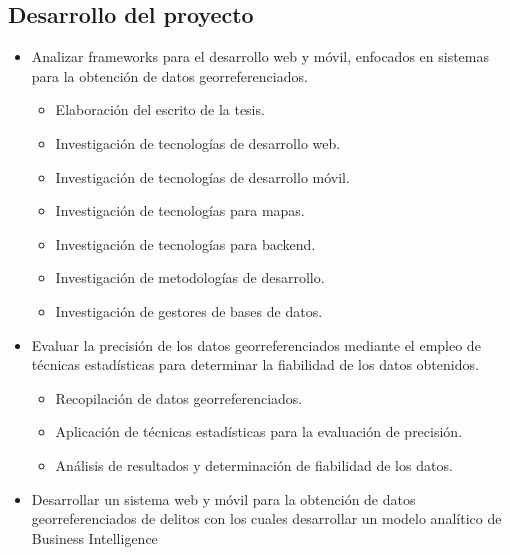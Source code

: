 \subsection{Desarrollo del proyecto}
\begin{itemize}
      \item Analizar frameworks para el
            desarrollo web y móvil, enfocados
            en sistemas para la obtención de
            datos georreferenciados.
            \begin{itemize}
                  \item Elaboración del escrito de la tesis.
                  \item Investigación de tecnologías de
                        desarrollo web.
                  \item Investigación de tecnologías de
                        desarrollo móvil.
                  \item Investigación de tecnologías
                        para mapas.
                  \item Investigación de tecnologías
                        para backend.
                  \item Investigación de metodologías
                        de desarrollo.
                  \item Investigación de gestores de
                        bases de datos.
            \end{itemize}
      \item Evaluar la precisión de los datos
            georreferenciados mediante el
            empleo de técnicas estadísticas
            para determinar la fiabilidad de los
            datos obtenidos.
            \begin{itemize}
                  \item Recopilación de datos
                        georreferenciados.
                  \item Aplicación de técnicas
                        estadísticas para la evaluación
                        de precisión.
                  \item Análisis de resultados y
                        determinación de fiabilidad
                        de los datos.
            \end{itemize}
      \item Desarrollar un sistema web y
            móvil para la obtención de datos
            georreferenciados de delitos con
            los cuales desarrollar un modelo
            analítico de Business Intelligence

\end{itemize}
